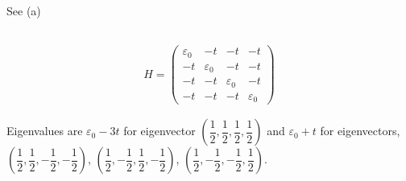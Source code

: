 \documentclass[10pt,fleqn]{article}
\newcommand{\eqar}[1]
{
  \begin{align*}
    #1
  \end{align*}
}
\newcommand{\paren}[1]{{\left({#1}\right)}}
\begin{document}
\subsection{}
See (a)
\subsection{}
\eqar{
  H=\begin{pmatrix}
    \varepsilon_0&-t&-t&-t\\
    -t&\varepsilon_0&-t&-t\\
    -t&-t&\varepsilon_0&-t\\
    -t&-t&-t&\varepsilon_0
  \end{pmatrix}
}
Eigenvalues are $\varepsilon_0-3t$ for eigenvector $\paren{\dfrac12,\dfrac12,\dfrac12,\dfrac12}$ and $\varepsilon_0+t$ for eigenvectors, $\paren{\dfrac12,\dfrac12,-\dfrac12,-\dfrac12}$, $\paren{\dfrac12,-\dfrac12,\dfrac12,-\dfrac12}$, $\paren{\dfrac12,-\dfrac12,-\dfrac12,\dfrac12}$.
\section{}
\subsection{}
\subsection{}
\subsection{}
\section{}
\section{}
\subsection{}
\subsection{}
\subsection{}
\subsection{}
\subsection{}
\section{}
\subsection{}
\subsection{}
\subsection{}
\end{document}
